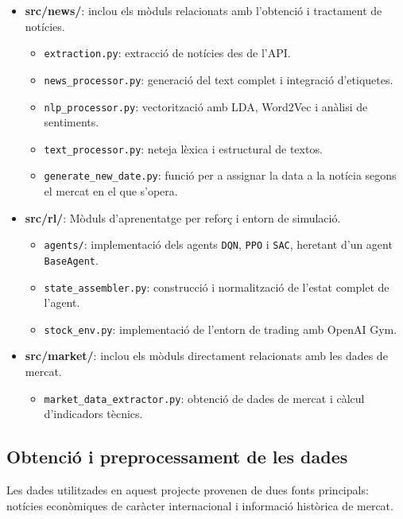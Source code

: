 \documentclass[12pt,a4paper,twoside]{book}
\begin{document}
\begin{itemize}
    \item \textbf{src/news/}: inclou els mòduls relacionats amb l'obtenció i tractament de notícies.
    \begin{itemize}
        \item \texttt{extraction.py}: extracció de notícies des de l'API.
        \item \texttt{news\_processor.py}: generació del text complet i integració d'etiquetes.
        \item \texttt{nlp\_processor.py}: vectorització amb LDA, Word2Vec i anàlisi de sentiments.
        \item \texttt{text\_processor.py}: neteja lèxica i estructural de textos.
        \item \texttt{generate\_new\_date.py}: funció per a assignar la data a la notícia segons el mercat en el que s'opera.
    \end{itemize}

    \item \textbf{src/rl/}: Mòduls d'aprenentatge per reforç i entorn de simulació.
    \begin{itemize}
        \item \texttt{agents/}: implementació dels agents \texttt{DQN}, \texttt{PPO} i \texttt{SAC}, heretant d'un agent \texttt{BaseAgent}.
        \item \texttt{state\_assembler.py}: construcció i normalització de l'estat complet de l'agent.
        \item \texttt{stock\_env.py}: implementació de l'entorn de trading amb OpenAI Gym.
    \end{itemize}

    \item \textbf{src/market/}: inclou els mòduls directament relacionats amb les dades de mercat.
    \begin{itemize}
        \item \texttt{market\_data\_extractor.py}: obtenció de dades de mercat i càlcul d'indicadors tècnics.
    \end{itemize}
\end{itemize}

\subsection{Obtenció i preprocessament de les dades}

Les dades utilitzades en aquest projecte provenen de dues fonts principals: notícies econòmiques de caràcter internacional i informació històrica de mercat.
\end{document}
